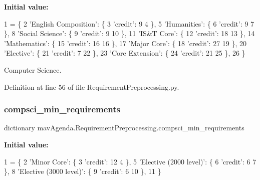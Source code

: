 {\bfseries Initial value\+:}
\begin{DoxyCode}
1 =  \{
2     \textcolor{stringliteral}{'English Composition'}: \{
3         \textcolor{stringliteral}{'credit'}: 9
4     \},
5     \textcolor{stringliteral}{'Humanities'}: \{
6         \textcolor{stringliteral}{'credit'}: 9
7     \},
8     \textcolor{stringliteral}{'Social Science'}: \{
9         \textcolor{stringliteral}{'credit'}: 9
10     \},
11     \textcolor{stringliteral}{'IS&T Core'}: \{
12         \textcolor{stringliteral}{'credit'}: 18
13     \},
14     \textcolor{stringliteral}{'Mathematics'}: \{
15         \textcolor{stringliteral}{'credit'}: 16
16     \},
17     \textcolor{stringliteral}{'Major Core'}: \{
18         \textcolor{stringliteral}{'credit'}: 27
19     \},
20     \textcolor{stringliteral}{'Elective'}: \{
21         \textcolor{stringliteral}{'credit'}: 7
22     \},
23     \textcolor{stringliteral}{'Core Extension'}: \{
24         \textcolor{stringliteral}{'credit'}: 21
25     \},
26 \}
\end{DoxyCode}


Computer Science. 



Definition at line 56 of file Requirement\+Preprocessing.\+py.

\mbox{\label{namespacemavAgenda_1_1RequirementPreprocessing_a9d9ed0140986f282669121f70be9708e}} 
\subsubsection{\texorpdfstring{compsci\+\_\+min\+\_\+requirements}{compsci\_min\_requirements}}
{\footnotesize\ttfamily dictionary mav\+Agenda.\+Requirement\+Preprocessing.\+compsci\+\_\+min\+\_\+requirements}

{\bfseries Initial value\+:}
\begin{DoxyCode}
1 =  \{
2     \textcolor{stringliteral}{'Minor Core'}: \{
3         \textcolor{stringliteral}{'credit'}: 12
4     \},
5     \textcolor{stringliteral}{'Elective (2000 level)'}: \{
6         \textcolor{stringliteral}{'credit'}: 6
7     \},
8     \textcolor{stringliteral}{'Elective (3000 level)'}: \{
9         \textcolor{stringliteral}{'credit'}: 6
10     \},
11 \}
\end{DoxyCode}


